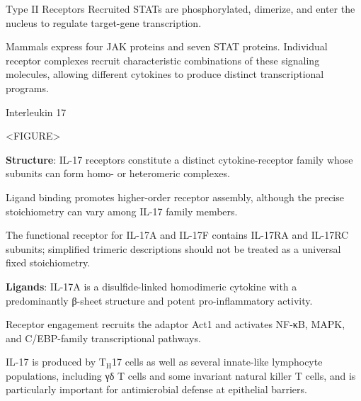 \begin{core}{Type II Receptors}
      Recruited STATs are phosphorylated, dimerize, and enter the nucleus to regulate target-gene transcription.

      Mammals express four JAK proteins and seven STAT proteins. Individual receptor complexes recruit characteristic combinations of these signaling molecules, allowing different cytokines to produce distinct transcriptional programs.

    \end{core}

    \begin{core}{Interleukin 17}

      <FIGURE>

      \textbf{Structure}: IL-17 receptors constitute a distinct cytokine-receptor family whose subunits can form homo- or heteromeric complexes.

      Ligand binding promotes higher-order receptor assembly, although the precise stoichiometry can vary among IL-17 family members.

      The functional receptor for IL-17A and IL-17F contains IL-17RA and IL-17RC subunits; simplified trimeric descriptions should not be treated as a universal fixed stoichiometry.

      \textbf{Ligands}: IL-17A is a disulfide-linked homodimeric cytokine with a predominantly β-sheet structure and potent pro-inflammatory activity.

      Receptor engagement recruits the adaptor Act1 and activates NF-κB, MAPK, and C/EBP-family transcriptional pathways.

      IL-17 is produced by T$_{\text{H}}$17 cells as well as several innate-like lymphocyte populations, including γδ T cells and some invariant natural killer T cells, and is particularly important for antimicrobial defense at epithelial barriers.

    \end{core}


